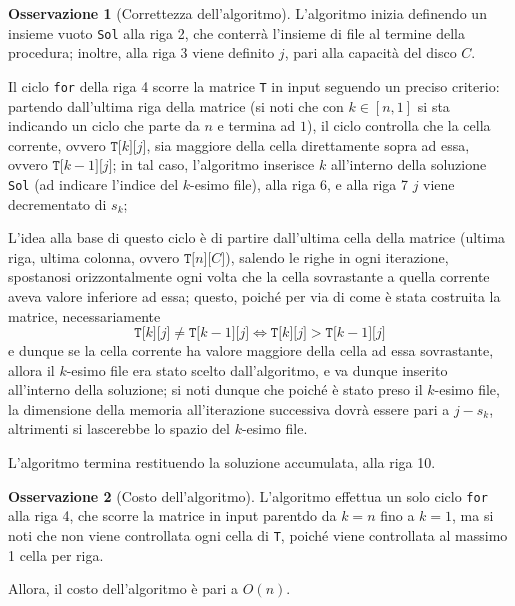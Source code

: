 \documentclass[14pt]{extreport}
\theoremstyle{definition}
\theoremstyle{definition}
\newtheorem{remark}{Osservazione}[subsection]
\begin{document}
\begin{remark}[Correttezza dell'algoritmo]
    L'algoritmo inizia definendo un insieme vuoto \texttt{Sol} alla riga 2, che conterrà l'insieme di file al termine della procedura; inoltre, alla riga 3 viene definito $j$, pari alla capacità del disco $C$.

    Il ciclo \texttt{for} della riga 4 scorre la matrice \texttt{T} in input seguendo un preciso criterio: partendo dall'ultima riga della matrice (si noti che con $k \in [n, 1]$ si sta indicando un ciclo che parte da $n$ e termina ad $1$), il ciclo controlla che la cella corrente, ovvero $\texttt{T[}k\texttt{][}j\texttt{]}$, sia maggiore della cella direttamente sopra ad essa, ovvero $\texttt{T[}k - 1\texttt{][}j\texttt{]}$; in tal caso, l'algoritmo inserisce $k$ all'interno della soluzione \texttt{Sol} (ad indicare l'indice del $k$-esimo file), alla riga 6, e alla riga 7 $j$ viene decrementato di $s_k$;

    L'idea alla base di questo ciclo è di partire dall'ultima cella della matrice (ultima riga, ultima colonna, ovvero $\texttt{T[}n\texttt{][}C\texttt{]}$), salendo le righe in ogni iterazione, spostanosi orizzontalmente ogni volta che la cella sovrastante a quella corrente aveva valore inferiore ad essa; questo, poiché per via di come è stata costruita la matrice, necessariamente $$\texttt{T[}k\texttt{][}j\texttt{]} \neq \texttt{T[}k -1\texttt{][}j\texttt{]} \iff \texttt{T[}k\texttt{][}j\texttt{]} > \texttt{T[}k -1\texttt{][}j\texttt{]}$$ e dunque se la cella corrente ha valore maggiore della cella ad essa sovrastante, allora il $k$-esimo file era stato scelto dall'algoritmo, e va dunque inserito all'interno della soluzione; si noti dunque che poiché è stato preso il $k$-esimo file, la dimensione della memoria all'iterazione successiva dovrà essere pari a $j - s_k$, altrimenti si lascerebbe lo spazio del $k$-esimo file.

    L'algoritmo termina restituendo la soluzione accumulata, alla riga 10.
\end{remark}

\begin{remark}[Costo dell'algoritmo]
    L'algoritmo effettua un solo ciclo \texttt{for} alla riga 4, che scorre la matrice in input parentdo da $k = n$ fino a $k = 1$, ma si noti che non viene controllata ogni cella di \texttt{T}, poiché viene controllata al massimo 1 cella per riga.

    Allora, il costo dell'algoritmo è pari a $O(n)$.
\end{remark}
\end{document}
